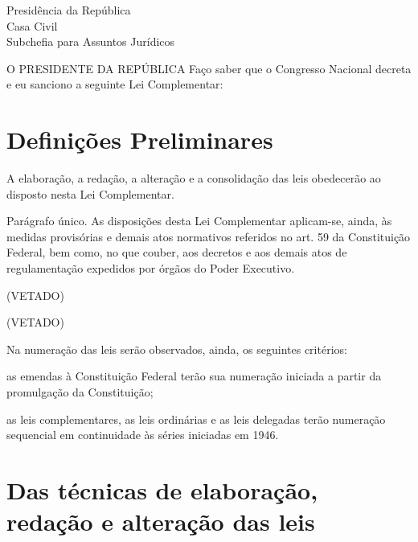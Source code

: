 \documentclass[a5paper,capitulo,titlepage=false]{br-lex}
\begin{document}
\begin{center}
		Presidência da República\\
	Casa Civil\\
	Subchefia para Assuntos Jurídicos	
\end{center}




O PRESIDENTE DA REPÚBLICA Faço  saber  que   o    Congresso  Nacional decreta e eu sanciono  a  seguinte Lei Complementar:
	
\chapter{Definições Preliminares}
\label{chap:disposicoes}


\artigo A elaboração, a redação, a alteração e a consolidação das leis obedecerão ao disposto nesta Lei Complementar.

Parágrafo único. As disposições desta Lei Complementar aplicam-se, ainda, às medidas provisórias e demais atos normativos referidos no art. 59 da Constituição Federal, bem como, no que couber, aos decretos e aos demais atos de regulamentação expedidos por órgãos do Poder Executivo.

\artigo (VETADO)


\paragrafo (VETADO)

\paragrafo Na numeração das leis serão observados, ainda, os seguintes critérios:

\inciso  as emendas à Constituição Federal terão sua numeração iniciada a partir da promulgação da Constituição;

\alinea   as leis complementares, as leis ordinárias e as leis delegadas terão numeração sequencial em continuidade às séries iniciadas em 1946.




\chapter[Das técnicas de elaboração, redação e alteração das leis]{Das técnicas de elaboração,\protect\\ redação e alteração das leis}
\label{chap:tecnicas}
\end{document}
